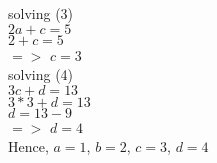 \documentclass{article}
\begin{document}
solving (3)\\
$2a+c=5$\\
$2+c=5$\\
$=>$\hspace{2cm}  $c=3$\\

solving (4)\\
$3c+d=13$\\
$3*3+d=13$\\
$d=13-9$\\
$=>$\hspace{2cm} $d=4$\\
Hence, $a=1$, $b=2$, $c=3$, $d=4$\\
\end{document}
